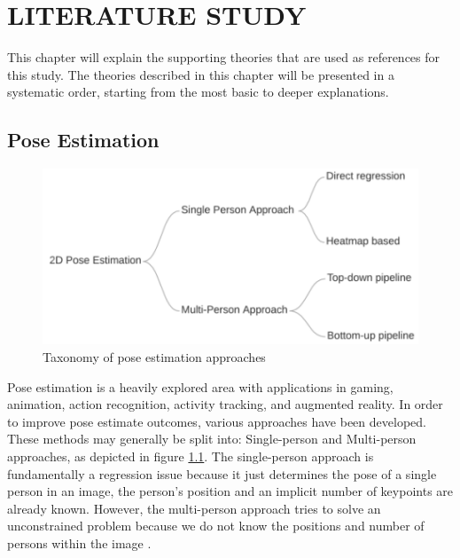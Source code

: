 \chapter{LITERATURE STUDY}
\label{chap:literaturestudy}


This chapter will explain the supporting theories that are used as references for this study.
The theories described in this chapter will be presented in a systematic order, starting from the most basic
to deeper explanations.

\section{Pose Estimation}
\label{sec:poseestimation}

\begin{figure}[ht]
  \centering

  \includegraphics[scale=1]{gambar/taxonomy-pose-estimation.png}

  \caption{Taxonomy of pose estimation approaches}
  \label{fig:pose-estimation}
\end{figure}

Pose estimation is a heavily explored area with applications in gaming, animation, action recognition, activity tracking, and augmented reality.
In order to improve pose estimate outcomes, various approaches have been developed. These methods may generally be split into: Single-person and Multi-person approaches, 
as depicted in figure \ref{fig:pose-estimation}. The single-person approach is fundamentally a regression issue because it just determines the pose of a single person in an image, 
the person's position and an implicit number of keypoints are already known. However, the multi-person approach tries to solve an unconstrained problem because we do not know 
the positions and number of persons within the image \parencite{romeo}.

